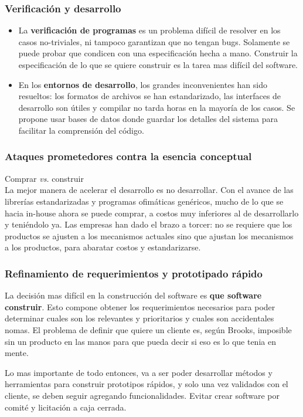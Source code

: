 \documentclass{beamer}
\begin{document}
\begin{frame}[fragile]
  \frametitle{Verificaci\'on y desarrollo}
  \begin{itemize}
\item La \textbf{verificaci\'on de programas} es un problema dif\'icil de resolver en los casos
  no-triviales, ni tampoco garantizan que no tengan bugs. Solamente se puede
  probar que condicen con una especificaci\'on hecha a mano. Construir la especificaci\'on
  de lo que se quiere construir es la tarea mas dif\'icil del software.
\item En los \textbf{entornos de desarrollo}, los grandes inconvenientes han sido resueltos: los formatos de archivos se han
  estandarizado, las interfaces de desarrollo son \'utiles y compilar no tarda horas en
  la mayor\'ia de los casos. Se propone usar bases de datos donde guardar los detalles
  del sistema para facilitar la comprensi\'on del c\'odigo.
  \end{itemize}
\end{frame}


\begin{frame}[fragile]
  \frametitle{Ataques prometedores contra la esencia conceptual}
  Comprar \textit{vs.} construir \\
  La mejor manera de acelerar el desarrollo es no desarrollar. Con el avance de las
  librer\'ias estandarizadas y programas ofim\'aticas gen\'ericos, mucho de lo que se hacia
  in-house ahora se puede comprar, a costos muy inferiores al de desarrollarlo y teni\'endolo
  ya. Las empresas han dado el brazo a torcer: no se requiere que los productos se ajusten a
  los mecanismos actuales sino que ajustan los mecanismos a los productos, para abaratar costos
  y estandarizarse.
\end{frame}


\begin{frame}[fragile]
  \frametitle{Refinamiento de requerimientos y prototipado r\'apido}
  La decisi\'on mas dif\'icil en la construcci\'on del software es \textbf{que software construir}. Esto
  compone obtener los requerimientos necesarios para poder determinar cuales son los relevantes y
  prioritarios y cuales son accidentales nomas. El problema de definir que quiere un cliente
  es, seg\'un Brooks, imposible sin un producto en las manos para que pueda decir si eso es lo
  que tenia en mente.

  Lo mas importante de todo entonces, va a ser poder desarrollar m\'etodos y herramientas para
  construir prototipos r\'apidos, y solo una vez validados con el cliente, se deben seguir
  agregando funcionalidades. Evitar crear software por comit\'e y licitaci\'on a caja cerrada.
\end{frame}
\end{document}
